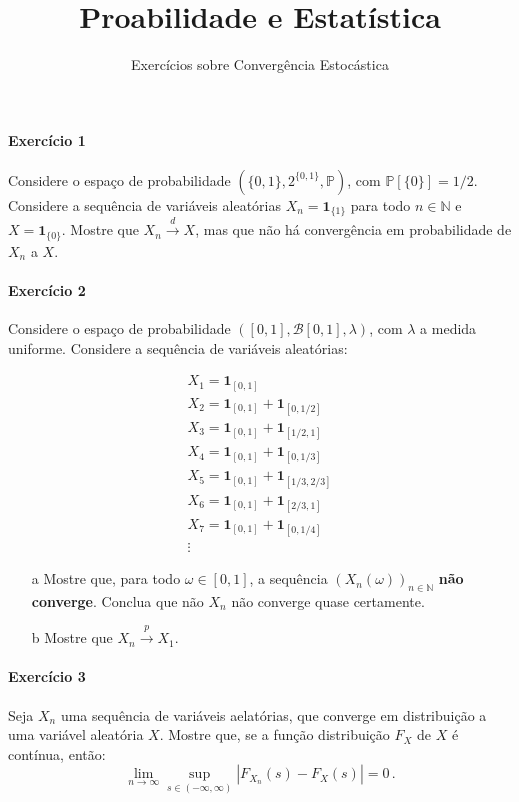 \documentclass[10pt,a4paper]{article}
\title{\large Proabilidade e Estatística}
\author{\normalsize Exercícios sobre Convergência Estocástica}
\date{}
\begin{document}
	\maketitle
 \paragraph{Exercício 1} Considere o espaço de probabilidade $(\{0,1\}, 2^{\{0,1\}},\mathbb{P})$, com $\mathbb{P}[\{0\}]=1/2$. Considere a sequência de variáveis aleatórias $X_n = \mathbf{1}_{\{1\}}$ para todo $n \in \mathbb{N}$ e $X = \mathbf{1}_{\{0\}}$. Mostre que $X_n \overset{d}{\to} X$, mas que não há convergência em probabilidade de $X_n$ a $X$.
 \paragraph{Exercício 2} Considere o espaço de probabilidade $([0,1], \mathcal{B}[0,1],\lambda)$, com $\lambda$ a medida uniforme. Considere a sequência de variáveis aleatórias:
 
 \begin{align*}
 	X_1 = \mathbf{1}_{[0,1]}  \\
 	X_2 = \mathbf{1}_{[0,1]} +\mathbf{1}_{[0,1/2]} \\
 	 X_3 = \mathbf{1}_{[0,1]} +\mathbf{1}_{[1/2,1]} \\
 	  	 X_4 = \mathbf{1}_{[0,1]} +\mathbf{1}_{[0,1/3]} \\
 	  	  	  	 X_5 = \mathbf{1}_{[0,1]} +\mathbf{1}_{[1/3,2/3]} \\
 	  	  	  	  	  	 X_6 = \mathbf{1}_{[0,1]} +\mathbf{1}_{[2/3,1]} \\
 	  	  	  	  	  	  	  	  	  	  	  	 X_7 = \mathbf{1}_{[0,1]} +\mathbf{1}_{[0,1/4]} \\
 	  	  	  	  	  	 \vdots 
 \end{align*}
 \begin{itemize}
 	\item[a] Mostre que, para todo $\omega \in [0,1]$, a sequência $(X_n(\omega))_{n \in \mathbb{N}}$ \textbf{não converge}. Conclua que não $X_n$ não converge quase certamente.
 	\item[b] Mostre que $X_n \overset{p}{\to} X_1$.
 \end{itemize}
 
 \paragraph{Exercício 3} Seja $X_n$ uma sequência de variáveis aelatórias, que converge em distribuição a uma variável aleatória $X$. Mostre que, se a função distribuição $F_{X}$ de $X$ é contínua, então:
 $$\lim_{n\to \infty}\sup_{s\in (-\infty,\infty)} |F_{X_n}(s) - F_X(s)| = 0\, .$$
 
\end{document}
